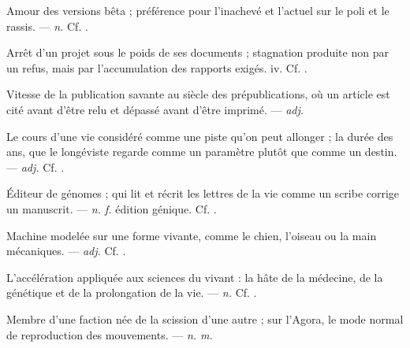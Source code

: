  Amour des versions bêta ; préférence pour l'inachevé et l'actuel sur le poli et le rassis.  ---  \textit{n.} Cf. .

 Arrêt d'un projet sous le poids de ses documents ; stagnation produite non par un refus, mais par l'accumulation des rapports exigés.   iv. Cf. .

 Vitesse de la publication savante au siècle des prépublications, où un article est cité avant d'être relu et dépassé avant d'être imprimé. ---  \textit{adj.}

 Le cours d'une vie considéré comme une piste qu'on peut allonger ; la durée des ans, que le longéviste regarde comme un paramètre plutôt que comme un destin. ---  \textit{adj.} Cf. .

 Éditeur de génomes ; qui lit et récrit les lettres de la vie comme un scribe corrige un manuscrit.  ---  \textit{n. f.} édition génique. Cf. .

 Machine modelée sur une forme vivante, comme le chien, l'oiseau ou la main mécaniques. ---  \textit{adj.} Cf. .

 L'accélération appliquée aux sciences du vivant : la hâte de la médecine, de la génétique et de la prolongation de la vie.  ---  \textit{n.} Cf. .

 Membre d'une faction née de la scission d'une autre ; sur l'Agora, le mode normal de reproduction des mouvements.   ---  \textit{n. m.}

